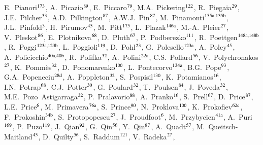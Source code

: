 \begin{flushleft}
E.~Pianori$^\textrm{\scriptsize 173}$,
A.~Picazio$^\textrm{\scriptsize 89}$,
E.~Piccaro$^\textrm{\scriptsize 79}$,
M.A.~Pickering$^\textrm{\scriptsize 122}$,
R.~Piegaia$^\textrm{\scriptsize 29}$,
J.E.~Pilcher$^\textrm{\scriptsize 33}$,
A.D.~Pilkington$^\textrm{\scriptsize 87}$,
A.W.J.~Pin$^\textrm{\scriptsize 87}$,
M.~Pinamonti$^\textrm{\scriptsize 135a,135b}$,
J.L.~Pinfold$^\textrm{\scriptsize 3}$,
H.~Pirumov$^\textrm{\scriptsize 45}$,
M.~Pitt$^\textrm{\scriptsize 175}$,
L.~Plazak$^\textrm{\scriptsize 146a}$,
M.-A.~Pleier$^\textrm{\scriptsize 27}$,
V.~Pleskot$^\textrm{\scriptsize 86}$,
E.~Plotnikova$^\textrm{\scriptsize 68}$,
D.~Pluth$^\textrm{\scriptsize 67}$,
P.~Podberezko$^\textrm{\scriptsize 111}$,
R.~Poettgen$^\textrm{\scriptsize 148a,148b}$,
R.~Poggi$^\textrm{\scriptsize 123a,123b}$,
L.~Poggioli$^\textrm{\scriptsize 119}$,
D.~Pohl$^\textrm{\scriptsize 23}$,
G.~Polesello$^\textrm{\scriptsize 123a}$,
A.~Poley$^\textrm{\scriptsize 45}$,
A.~Policicchio$^\textrm{\scriptsize 40a,40b}$,
R.~Polifka$^\textrm{\scriptsize 32}$,
A.~Polini$^\textrm{\scriptsize 22a}$,
C.S.~Pollard$^\textrm{\scriptsize 56}$,
V.~Polychronakos$^\textrm{\scriptsize 27}$,
K.~Pomm\`es$^\textrm{\scriptsize 32}$,
D.~Ponomarenko$^\textrm{\scriptsize 100}$,
L.~Pontecorvo$^\textrm{\scriptsize 134a}$,
B.G.~Pope$^\textrm{\scriptsize 93}$,
G.A.~Popeneciu$^\textrm{\scriptsize 28d}$,
A.~Poppleton$^\textrm{\scriptsize 32}$,
S.~Pospisil$^\textrm{\scriptsize 130}$,
K.~Potamianos$^\textrm{\scriptsize 16}$,
I.N.~Potrap$^\textrm{\scriptsize 68}$,
C.J.~Potter$^\textrm{\scriptsize 30}$,
G.~Poulard$^\textrm{\scriptsize 32}$,
T.~Poulsen$^\textrm{\scriptsize 84}$,
J.~Poveda$^\textrm{\scriptsize 32}$,
M.E.~Pozo~Astigarraga$^\textrm{\scriptsize 32}$,
P.~Pralavorio$^\textrm{\scriptsize 88}$,
A.~Pranko$^\textrm{\scriptsize 16}$,
S.~Prell$^\textrm{\scriptsize 67}$,
D.~Price$^\textrm{\scriptsize 87}$,
L.E.~Price$^\textrm{\scriptsize 6}$,
M.~Primavera$^\textrm{\scriptsize 76a}$,
S.~Prince$^\textrm{\scriptsize 90}$,
N.~Proklova$^\textrm{\scriptsize 100}$,
K.~Prokofiev$^\textrm{\scriptsize 62c}$,
F.~Prokoshin$^\textrm{\scriptsize 34b}$,
S.~Protopopescu$^\textrm{\scriptsize 27}$,
J.~Proudfoot$^\textrm{\scriptsize 6}$,
M.~Przybycien$^\textrm{\scriptsize 41a}$,
A.~Puri$^\textrm{\scriptsize 169}$,
P.~Puzo$^\textrm{\scriptsize 119}$,
J.~Qian$^\textrm{\scriptsize 92}$,
G.~Qin$^\textrm{\scriptsize 56}$,
Y.~Qin$^\textrm{\scriptsize 87}$,
A.~Quadt$^\textrm{\scriptsize 57}$,
M.~Queitsch-Maitland$^\textrm{\scriptsize 45}$,
D.~Quilty$^\textrm{\scriptsize 56}$,
S.~Raddum$^\textrm{\scriptsize 121}$,
V.~Radeka$^\textrm{\scriptsize 27}$,

\end{flushleft}
